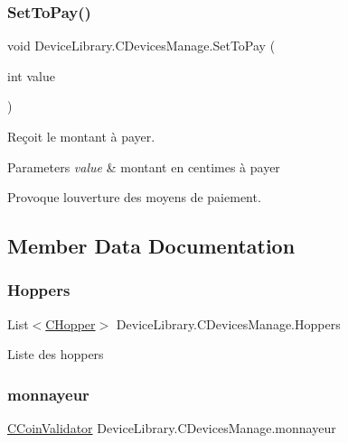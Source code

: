 \subsubsection{\texorpdfstring{Set\+To\+Pay()}{SetToPay()}}
{\footnotesize\ttfamily void Device\+Library.\+C\+Devices\+Manage.\+Set\+To\+Pay (\begin{DoxyParamCaption}\item[{int}]{value }\end{DoxyParamCaption})\hspace{0.3cm}{\ttfamily [inline]}}



Reçoit le montant à payer. 


\begin{DoxyParams}{Parameters}
{\em value} & montant en centimes à payer\\
\hline
\end{DoxyParams}


Provoque l\textquotesingle{}ouverture des moyens de paiement.

\subsection{Member Data Documentation}
\mbox{\label{class_device_library_1_1_c_devices_manage_ae9d4323b152f0a1767c004668d2ab3ea}} 
\subsubsection{\texorpdfstring{Hoppers}{Hoppers}}
{\footnotesize\ttfamily List$<$\mbox{\hyperlink{class_device_library_1_1_c_hopper}{C\+Hopper}}$>$ Device\+Library.\+C\+Devices\+Manage.\+Hoppers}



Liste des hoppers 

\mbox{\label{class_device_library_1_1_c_devices_manage_a0a0fd3a37a1a8c01b2227b3cd0029b11}} 
\subsubsection{\texorpdfstring{monnayeur}{monnayeur}}
{\footnotesize\ttfamily \mbox{\hyperlink{class_device_library_1_1_c_coin_validator}{C\+Coin\+Validator}} Device\+Library.\+C\+Devices\+Manage.\+monnayeur}



